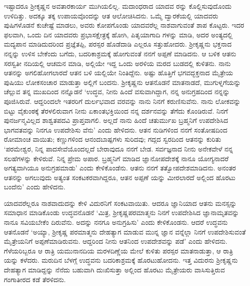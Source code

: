 ಇಷ್ಟಾದರೂ ಶ್ರೀಕೃಷ್ಣನ ಅವತಾರಕಾರ್ಯ ಮುಗಿಯಲಿಲ್ಲ. ಮದಾಂಧರಾದ ಯಾದವ ರನ್ನು ಕೊಲ್ಲಿಸುವುದೊಂದು ಉಳಿದಿತ್ತು. ಅದಕ್ಕೂ ತಕ್ಕ ಉಪಾಯವೊಂದನ್ನು ಆತ ಆಲೋಚಿಸಿದನು. ಒಮ್ಮೆ ದ್ವಾರಕೆಯಲ್ಲಿ ಯಾದವರು ಪುಷಿಗಳೊಡನೆ ಕುಚೇಷ್ಟೆ ಮಾಡಲು, ಅವರು ಕೋಪಗೊಂಡು ಯಾದವರೆಲ್ಲ ನಾಶವಾಗುವಂತೆ ಶಾಪ ಕೊಟ್ಟರು. ಇದರ ಫಲವಾಗಿ, ಒಂದು ದಿನ ಯಾದವರು ಪ್ರಭಾಸಕ್ಷೇತ್ರಕ್ಕೆ ಹೋಗಿ, ಪಿತೃಯಾಗಾದಿ ಗಳನ್ನು ಮಾಡಿ, ಅದರ ಅಂತ್ಯದಲ್ಲಿ ಮದ್ಯಪಾನ ಮಾಡಿದುದರಿಂದ ಪ್ರಜ್ಞೆತಪ್ಪಿ, ಪರಸ್ಪರ ಹೊಡೆದಾಡಿ ಎಲ್ಲರೂ ಸತ್ತುಹೋದರು. ಶ್ರೀಕೃಷ್ಣನು ಭಕ್ತನಾದ ನನ್ನನ್ನು ಉಳಿಸ ಬೇಕೆಂದು ಬಗೆದು, ಬದರಿಕಾಶ್ರಮಕ್ಕೆ ಹೋಗುವಂತೆ ನನಗೆ ಅಪ್ಪಣೆ ಮಾಡಿದನು. ಆ ಬಳಿಕ ಆತನು ಸರಸ್ವತೀ ನದಿಯಲ್ಲಿ ಆಚಮನ ಮಾಡಿ, ಅಲ್ಲಿಯೇ ಇದ್ದ ಒಂದು ಅರಳಿಯ ಮರದ ಬುಡದಲ್ಲಿ ಕುಳಿತನು. ನಾನು ಆತನನ್ನು ಅಗಲಿಹೋಗಲಾರದೆ ಆತನ ಬಳಿ ಯಲ್ಲಿಯೇ ನಿಂತಿದ್ದೆನು. ಅಷ್ಟು ಹೊತ್ತಿಗೆ ಭಗವದ್ಭಕ್ತನಾದ ಮೈತ್ರೇಯ ಪುಷಿಯು ಲೋಕಸಂಚಾರ ಮಾಡುತ್ತಾ ಅಲ್ಲಿಗೆ ಬಂದನು. ಶ್ರೀಕೃಷ್ಣನು ಆತನೊಡನೆ ಮಾತನಾಡದೆ, ಮುಗುಳ್ನಗೆಯನ್ನು ಚೆಲ್ಲುವ ತನ್ನ ಮುಖದಿಂದ ನನ್ನೊಡನೆ ‘ಉದ್ಧವ, ನೀನು ಹಿಂದೆ ವಸುವಾಗಿದ್ದಾಗ, ನನ್ನ ಅನುಗ್ರಹದಿಂದ ನನ್ನನ್ನು ಪೂಜಿಸಿರುವೆ. ಆದ್ದರಿಂದಲೇ ಇತರರಿಗೆ ದುರ್ಲಭವಾದ ವರವನ್ನು ನಾನು ನಿನಗೆ ಕರುಣಿಸುವೆನು. ನಾನು ಲೋಕವನ್ನು ಬಿಟ್ಟು ವೈಕುಂಠಕ್ಕೆ ತೆರಳಲಿರುವಾಗ ನೀನು ಏಕಾಂತಭಕ್ತಿಯಿಂದ ನನ್ನ ದರ್ಶನವನ್ನು ತೆಗೆದು ಕೊಂಡಿರುವೆ. ನಿನಗೆ ಪುನರ್ಜನ್ಮವಿಲ್ಲದ ಶಾಶ್ವತಪದವಿ ಪ್ರಾಪ್ತವಾಗಲಿ. ಅಲ್ಲದೆ ನಾನು ಹಿಂದೆ ಚತುರ್ಮುಖ ಬ್ರಹ್ಮನಿಗೆ ಉಪದೇಶಿಸಿದ ಭಾಗವತವನ್ನು ನಿನಗೂ ಉಪದೇಶಿಸು ವೆನು’ ಎಂದು ಹೇಳಿದನು. ಆತನ ನುಡಿಗಳಿಂದ ನನಗೆ ಸಂತೋಷದಿಂದ ರೋಮಾಂಚ ವಾಯಿತು; ಕಣ್ಣುಗಳಿಂದ ಆನಂದಬಾಷ್ಪಗಳು ಸುರಿದವು; ಗದ್ಗದ ಸ್ವರದಿಂದ ಆತನನ್ನು ಕುರಿತು ‘ಪರಮೇಶ್ವರ, ನಿನ್ನ ಪಾದಸೇವೆಯೊಂದಲ್ಲದೆ ಬೇರಾವುದೂ ನನಗೆ ಬೇಡ. ಸರ್ವಜ್ಞನಾದ ನೀನು ಅನೇಕವೇಳೆ ನನ್ನ ಸಲಹೆಗಳನ್ನು ಕೇಳಿರುವೆ. ನಿನ್ನ ಪ್ರೇಮ ಅಪಾರ. ಬ್ರಹ್ಮನಿಗೆ ಮಾಡಿದ ಜ್ಞಾನೋಪದೇಶಕ್ಕೆ ನಾನೂ ಯೋಗ್ಯನಾದರೆ ಅಗತ್ಯವಾಗಿಯೂ ಅನುಗ್ರಹಮಾಡು’ ಎಂದು ಕೇಳಿಕೊಂಡೆನು. ಆತನು ನನಗೆ ತತ್ವೋಪದೇಶಮಾಡಿದನು. ಅನಂತರ ಆತನನ್ನು ಅಗಲುವುದು ಅತ್ಯಂತ ಸಂಕಟಕರವಾಗಿದ್ದರೂ, ಆತನ ಅಪ್ಪಣೆ ಯನ್ನು ಮೀರಲಾರದೆ ಅಲ್ಲಿಂದ ಹೊರಟು ಬಂದೆನು’ ಎಂದು ಹೇಳಿದನು.

ಯಾದವರೆಲ್ಲರೂ ನಾಶವಾದುದನ್ನು ಕೇಳಿ ವಿದುರನಿಗೆ ಸಂಕಟವಾಯಿತು. ಆದರೂ ಜ್ಞಾನಿಯಾದ ಆತನು ಮನಸ್ಸನ್ನು ಸಮಾಧಾನ ಮಾಡಿಕೊಂಡು ಉದ್ಧವನೊಡನೆ ‘ಮಿತ್ರ, ಶ್ರೀಕೃಷ್ಣಪರಮಾತ್ಮನು ನಿನಗೆ ಉಪದೇಶಿಸಿದ ಜ್ಞಾನಾಮೃತವನ್ನು ನಾನೂ ಸವಿಯಬೇಕೆಂ ದಿರುವೆನು. ಅದನ್ನು ನನಗೂ ಅನುಗ್ರಹಿಸು’ ಎಂದು ಕೇಳಿಕೊಂಡನು. ಆದರೆ ಉದ್ಧವನು ಆತನೊಡನೆ ‘ಅಯ್ಯಾ, ಶ್ರೀಕೃಷ್ಣ ಪರಮಾತ್ಮನು ದೇಹತ್ಯಾಗ ಮಾಡುವ ಮುನ್ನ ಜ್ಞಾನ ವನ್ನೆಲ್ಲಾ ನಿನಗೆ ಉಪದೇಶಿಸುವಂತೆ ಮೈತ್ರೇಯನಿಗೆ ಅಪ್ಪಣೆಮಾಡಿರುವನು. ಆದ್ದರಿಂದ ನೀನು ಆತನಿಂದ ಉಪದೇಶವನ್ನು ಪಡೆ’ ಎಂದು ಹೇಳಿದನು. ಗೆಳೆಯರಿಬ್ಬರೂ ಆ ರಾತ್ರಿ ಯಮುನಾನದಿಯ ಮರಳದಿಣ್ಣೆಯ ಮೇಲೆ ಕುಳಿತು ಪರಸ್ಪರ ಮಾತನಾಡುತ್ತಾ, ಆ ರಾತ್ರಿ ಯನ್ನು ಕಳೆದರು. ಮರುದಿನ ಬೆಳಗ್ಗೆ ಉದ್ಧವನು ಬದರಿಕಾಶ್ರಮಕ್ಕೆ ಹೊರಟುಹೋದನು. ಇತ್ತ ವಿದುರನು ಶ್ರೀಕೃಷ್ಣನು ದೇಹತ್ಯಾಗ ಮಾಡಿದ್ದನ್ನು ನೆನೆದು ಬಹುವಾಗಿ ದುಃಖಿಸುತ್ತಾ ಅಲ್ಲಿಂದ ಹೊರಟು ಮೈತ್ರೇಯರು ವಾಸಿಸುತ್ತಿರುವ ಗಂಗಾತೀರದ ಕಡೆ ತೆರಳಿದನು.

